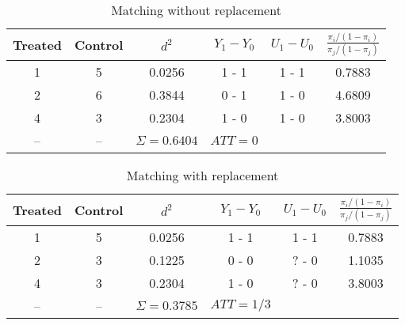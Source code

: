 \documentclass{article}
\begin{document}
\begin{itemize}
\begin{table}[!h]
\begin{center}
\begin{tabular}{cccc|cc|c}
		\end{tabular}
		\label{}
	\end{center}
\end{table}

\begin{table}[!h]
		\caption{Matching without replacement}
	\begin{center}
		\begin{tabular}{cccc|cc}
                  Treated & Control & $d^2$ & $Y_1 - Y_0$ & $U_1 - U_0$ & $\frac{\pi_i/(1-\pi_i)}{\pi_j/(1-\pi_j)}$ \\ \hline
                  1           & 5           & 0.0256   &1 - 1 &1 - 1 & 0.7883\\ 
                  2           & 6           & 0.3844   & 0 - 1  &1 - 0 & 4.6809 \\
                  4           & 3           & 0.2304    & 1 - 0 &1 - 0  & 3.8003                  \\
          \hline
                  -- & -- & $\Sigma = 0.6404$ & $ATT=0$ &
		\end{tabular}
		\label{}
	\end{center}
\end{table}

\begin{table}[h!!!!!!!]
		\caption{Matching with replacement}
	\begin{center}
		\begin{tabular}{cccc|cc}
                  Treated & Control & $d^2$ & $Y_1 - Y_0$ & $U_1 - U_0$& $\frac{\pi_i/(1-\pi_i)}{\pi_j/(1-\pi_j)}$ \\ \hline
                  1           & 5           & 0.0256   &1 - 1 &1 - 1 & 0.7883\\ 
                  2           & 3           & 0.1225   & 0 - 0 &? - 0  & 1.1035 \\
                  4           & 3           & 0.2304    & 1 - 0 &? - 0  & 3.8003\\
                  \hline
                  -- & -- & $\Sigma = 0.3785$ & $ATT=1/3$
                   
		\end{tabular}
		\label{}
	\end{center}
\end{table}



\end{itemize}
\end{document}
